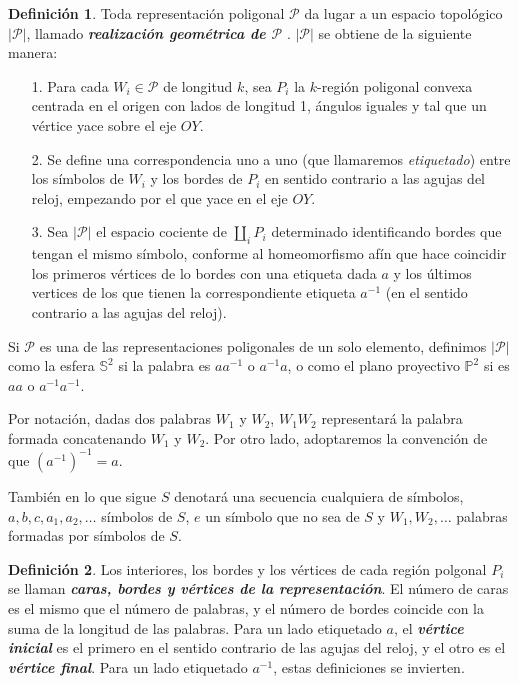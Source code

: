 \documentclass[10pt]{report}
\theoremstyle{definition}
\newtheorem{defin}{Definición}[section]
\begin{document}
\begin{defin}%
Toda representación poligonal $\mathcal{P}$ da lugar a un espacio topológico $|\mathcal{P}|$, llamado \textbf{\textit{realización geométrica de $\mathcal{P}$}} . $|\mathcal{P}|$ se obtiene de la siguiente manera:
\begin{itemize}
\item[1.] Para cada $W_i\in \mathcal{P}$ de longitud $k$, sea $P_i$ la $k$-región poligonal convexa centrada en el origen con lados de longitud 1, ángulos iguales y tal que un vértice yace sobre el eje $OY$.
\item[2.] Se define una correspondencia uno a uno (que llamaremos \textit{etiquetado}) entre los símbolos de $W_ i$ y los bordes de $P_i$ en sentido contrario a las agujas del reloj, empezando por el que yace en el eje $OY$.
\item[3.] Sea $|\mathcal{P}|$ el espacio cociente de $\coprod_i P_i$ determinado identificando bordes que tengan el mismo símbolo, conforme al homeomorfismo afín que hace coincidir los primeros vértices de lo bordes con una etiqueta dada $a$ y los últimos vertices de los que tienen la correspondiente etiqueta $a^{-1}$ (en el sentido contrario a las agujas del reloj).

\end{itemize}


Si $\mathcal{P}$ es una de las representaciones poligonales de un solo elemento, definimos $|\mathcal{P}|$ como la esfera $\mathbb{S}^2$ si la palabra es $aa^{-1}$ o $a^{-1}a$, o como el plano proyectivo $\mathbb{P}^2$ si es $aa$ o $a^{-1}a^{-1}$.%
\end{defin}

Por notación, dadas dos palabras $W_1$ y $W_2$, $W_1W_2$ representará la palabra formada concatenando $W_1$ y $W_2$. Por otro lado, adoptaremos la convención de que $(a^{-1})^{-1}=a$.

También en lo que sigue $S$ denotará una secuencia cualquiera de símbolos, $a,b,c,a_1,a_2,\dots$ símbolos de $S$, $e$ un símbolo que no sea de $S$ y $W_1, W_2, \dots$ palabras formadas por símbolos de $S$.

\begin{defin}%
Los interiores, los bordes y los vértices de cada región polgonal $P_i$ se llaman \textbf{\emph{caras, bordes y vértices de la representación}}. El número de caras es el mismo que el número de palabras, y el número de bordes coincide con la suma de la longitud de las palabras.
Para un lado etiquetado $a$, el \textbf{\emph{vértice inicial}} es el primero en el sentido contrario de las agujas del reloj, y el otro es el \textbf{\emph{vértice final}}. Para un lado etiquetado $a^{-1}$, estas definiciones se invierten. 
\end{defin}
\end{document}
